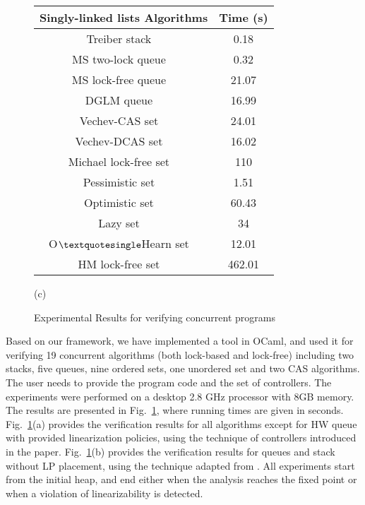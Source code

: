 \begin{figure}[]
\begin{tabular}{|c | c | }
  \hline
   \textsf{\textbf{{Singly-linked lists Algorithms}}} &  \textsf{\textbf{{Time (s)}}} \\
\hline
\textsf{Treiber stack  ~\cite{Treiber:stack}}\;\;\;\;\;\; & \textsf {0.18} \\
\hline
\textsf{MS two-lock queue  ~\cite{MS:QueueAlgorithms}}\;\;\;\;\;\;  & \textsf{0.32} \\
\hline
\textsf{MS lock-free queue  ~\cite{MS:QueueAlgorithms}}& \textsf{21.07} \\
\hline
\textsf{DGLM queue  ~\cite{Doherty:lockfree}}&  \textsf {16.99} \\
\hline
\textsf{Vechev-CAS set  ~\cite{Vechev:list}}  & \textsf{24.01} \\
\hline
\textsf{Vechev-DCAS set  ~\cite{Vechev:list}}   & \textsf{16.02}  \\
\hline
\textsf{Michael lock-free set ~\cite{Michael:list}}  & \textsf{110}  \\
\hline
\textsf{Pessimistic set  ~\cite{ArtOfMpP}}&\textsf{1.51} \\
\hline
\textsf{Optimistic set ~\cite{ArtOfMpP}}& \textsf{60.43} \\
\hline
\textsf{Lazy set ~\cite{Lazyset}  }  & \textsf {34} \\
\hline
\textsf {O$\textquotesingle $Hearn set  ~\cite{OHearnlist}}     & \textsf{12.01} \\
\hline
\textsf{HM lock-free set  ~\cite{ArtOfMpP} } & \textsf{462.01} \\
\hline
\end{tabular}


\vspace*{0.1cm}

(c)
\\
\caption{Experimental Results for verifying concurrent programs}
\label{Experiments:fig}
\end{figure}
Based on our framework, we have implemented a tool in OCaml, and used
it for
verifying 19 concurrent algorithms (both lock-based and lock-free)
including two stacks, 
five queues, nine ordered sets, one unordered set and two CAS algorithms. 
%
The user needs to provide the program code and the 
set of controllers.
%
The experiments were performed on a desktop 2.8 GHz processor with 8GB memory.
The results are presented in Fig.~\ref{Experiments:fig},
where running times are given in seconds. 
Fig.~\ref{Experiments:fig}(a) provides the verification
results for all algorithms except for HW queue with provided 
linearization policies, using the technique of controllers introduced in 
the paper. Fig.~\ref{Experiments:fig}(b) provides the verification
results for queues and stack without LP placement, using the technique 
adapted from \cite{BEEH:icalp15,HSV:concur13}.
%
All experiments start from the initial heap,  
and end either when the analysis 
reaches the fixed point or when a violation of linearizability is detected. 

